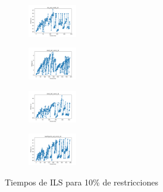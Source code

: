\begin{figure}[H]
\begin{subfigure}
        \centering
        \includegraphics[width=0.234\textwidth]{img/ils/iris_set_const_10_3773969821_time.png}
    \end{subfigure}
    \hfill
    \begin{subfigure}
        \centering
        \includegraphics[width=0.234\textwidth]{img/ils/ecoli_set_const_10_3773969821_time.png}
    \end{subfigure}
    \hfill
    \begin{subfigure}
        \centering
        \includegraphics[width=0.234\textwidth]{img/ils/rand_set_const_10_3773969821_time.png}
    \end{subfigure}
    \hfill
    \begin{subfigure}
        \centering
        \includegraphics[width=0.234\textwidth]{img/ils/newthyroid_set_const_10_3773969821_time.png}
    \end{subfigure}
    \caption{Tiempos de ILS para 10\% de restricciones}
\end{figure}

\vspace*{\fill}
\newpage
\vspace*{\fill}


